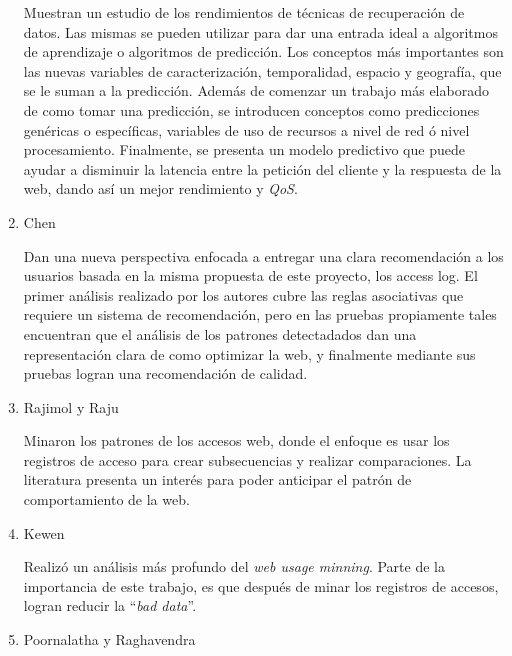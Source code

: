 \begin{enumerate}
	{  
  Muestran un estudio de los rendimientos de técnicas de recuperación de datos.
  Las mismas se pueden utilizar para dar una entrada ideal a algoritmos de aprendizaje o algoritmos de predicción. 
  Los conceptos más importantes son las nuevas variables de caracterización, temporalidad, espacio y geografía, que se le suman a la predicción. 
  Además de comenzar un trabajo más elaborado de como tomar una predicción, se introducen conceptos como predicciones genéricas o específicas, variables de uso de recursos a nivel de red ó nivel procesamiento.
  Finalmente, se presenta un modelo predictivo que puede ayudar a disminuir la latencia entre la petición del cliente y la respuesta de la web, dando así un mejor rendimiento y \emph{QoS}.
  
 }


  \item Chen \etal~\cite{Chen2011} 
  
	{  
	Dan una nueva perspectiva enfocada a entregar una clara recomendación a los usuarios basada en la misma propuesta de este proyecto, los access log.
	El primer análisis realizado por los autores cubre las reglas asociativas que requiere un sistema de recomendación, pero en las pruebas propiamente tales encuentran que el análisis de los patrones detectadados dan una representación clara de como optimizar la web, y finalmente mediante sus pruebas logran una recomendación de calidad.}
  \item Rajimol y Raju~\cite{Rajimol2012} 
	{  
	Minaron los patrones de los accesos web, donde el enfoque es usar los registros de acceso para crear subsecuencias y realizar comparaciones.
	La literatura presenta un interés para poder anticipar el patrón de comportamiento de la web.


	}
  \item Kewen~\cite{kewen2012} 
  
	{  
	Realizó un análisis más profundo del \emph{web usage minning}.
	Parte de la importancia de este trabajo, es que después de minar los registros de accesos, logran reducir la ``\emph{bad data}''.
	}

  \item Poornalatha y Raghavendra~\cite{Poornalatha2012}
  

\end{enumerate}

